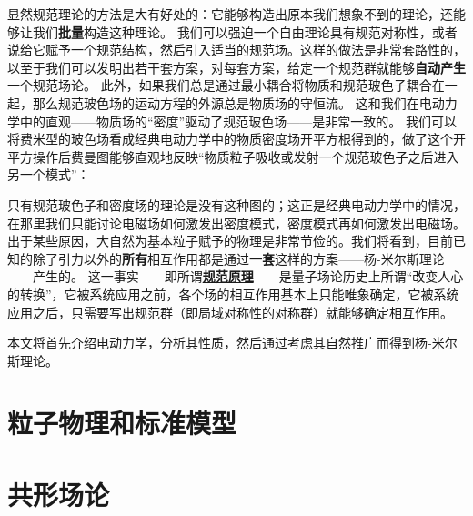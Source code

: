 \documentclass[hyperref, UTF8, a4paper]{ctexbook}
\newcommand{\concept}[1]{\underline{\textbf{#1}}}
\renewcommand{\emph}{\textbf}
\begin{document}
显然规范理论的方法是大有好处的：它能够构造出原本我们想象不到的理论，还能够让我们\emph{批量}构造这种理论。
我们可以强迫一个自由理论具有规范对称性，或者说给它赋予一个规范结构，然后引入适当的规范场。这样的做法是非常套路性的，以至于我们可以发明出若干套方案，对每套方案，给定一个规范群就能够\emph{自动产生}一个规范场论。
此外，如果我们总是通过最小耦合将物质和规范玻色子耦合在一起，那么规范玻色场的运动方程的外源总是物质场的守恒流。
这和我们在电动力学中的直观——物质场的“密度”驱动了规范玻色场——是非常一致的。
我们可以将费米型的玻色场看成经典电动力学中的物质密度场开平方根得到的，做了这个开平方操作后费曼图能够直观地反映“物质粒子吸收或发射一个规范玻色子之后进入另一个模式”：

只有规范玻色子和密度场的理论是没有这种图的；这正是经典电动力学中的情况，在那里我们只能讨论电磁场如何激发出密度模式，密度模式再如何激发出电磁场。
出于某些原因，大自然为基本粒子赋予的物理是非常节俭的。我们将看到，目前已知的除了引力以外的\emph{所有}相互作用都是通过\emph{一套}这样的方案——杨-米尔斯理论——产生的。
这一事实——即所谓\concept{规范原理}——是量子场论历史上所谓“改变人心的转换”，它被系统应用之前，各个场的相互作用基本上只能唯象确定，它被系统应用之后，只需要写出规范群（即局域对称性的对称群）就能够确定相互作用。

本文将首先介绍电动力学，分析其性质，然后通过考虑其自然推广而得到杨-米尔斯理论。







\part{粒子物理和标准模型}

\part{共形场论}




 
\end{document}
